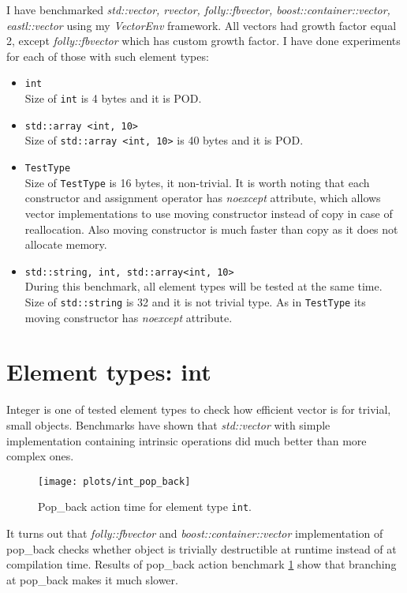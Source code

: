 \documentclass[inz, english, shortabstract]{iithesis}
\begin{document}
I have benchmarked {\it std::vector, rvector, folly::fbvector, boost::container::vector, eastl::vector} using my {\it VectorEnv} framework. All vectors had growth factor equal 2, except {\it folly::fbvector} which has custom growth factor. I have done experiments for each of those with such element types:
\begin{itemize}
\item \lstinline{int}
\\
Size of \lstinline{int} is 4 bytes and it is POD.
\item \lstinline{std::array <int, 10>}
\\
Size of \lstinline{std::array <int, 10>} is 40 bytes and it is POD.
\item \lstinline{TestType}
\\
Size of \lstinline{TestType} is 16 bytes, it non-trivial. It is worth noting that each constructor and assignment operator has {\it noexcept} attribute, which allows vector implementations to use moving constructor instead of copy in case of reallocation. Also moving constructor is much faster than copy as it does not allocate memory.
\item \lstinline{std::string, int, std::array<int, 10>}
\\
During this benchmark, all element types will be tested at the same time. Size of \lstinline{std::string} is 32 and it is not trivial type. As in \lstinline{TestType} its moving constructor has {\it noexcept} attribute.
\end{itemize}

\section{Element types: int}
Integer is one of tested element types to check how efficient vector is for trivial, small objects. Benchmarks have shown that {\it std::vector} with simple implementation containing intrinsic operations did much better than more complex ones. 

\begin{figure}[h!]
\texttt{[image: plots/int\_pop\_back]}
\caption{Pop\_back action time for element type \lstinline{int}.}
\label{int_pop_back}
\end{figure}

It turns out that {\it folly::fbvector} and {\it boost::container::vector} implementation of pop\_back checks whether object is trivially destructible at runtime instead of at compilation time. Results of pop\_back action benchmark \ref{int_pop_back} show that branching at pop\_back makes it much slower.
\end{document}
